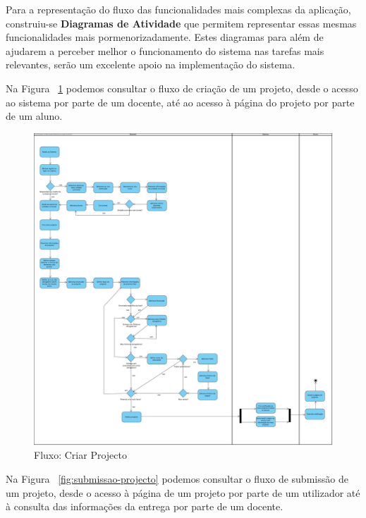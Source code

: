 Para a representação do fluxo das funcionalidades mais complexas da aplicação, construiu-se \textbf{Diagramas de Atividade} que permitem representar essas mesmas funcionalidades mais pormenorizadamente.
Estes diagramas para além de ajudarem a perceber melhor o funcionamento do sistema nas tarefas mais relevantes, serão um excelente apoio na implementação do sistema.

Na Figura ~\ref{fig:criacao-projecto} podemos consultar o fluxo de criação de um projeto, desde o acesso ao sistema por parte de um docente, até ao acesso à página do projeto por parte de um aluno.

\begin{figure}[H] 
  \centering
  \includegraphics[width=1\textwidth,center]{images/arquitetura/criacao-projecto}
  \caption{Fluxo: Criar Projecto}
  \label{fig:criacao-projecto}
\end{figure}

Na Figura ~\ref{fig:submissao-projecto} podemos consultar o fluxo de submissão de um projeto, desde o acesso à página de um projeto por parte de um utilizador até à consulta das informações da entrega por parte de um docente.

